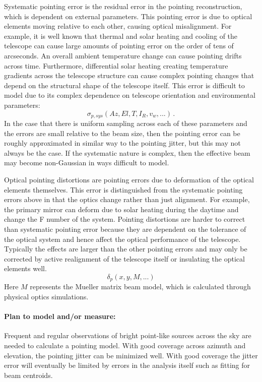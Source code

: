 Systematic pointing error is the residual error in the pointing reconstruction, which is dependent on external parameters. This pointing error is due to optical elements moving relative to each other, causing optical misalignment. For example, it is well known that thermal and solar heating and cooling of the telescope can cause large amounts of pointing error on the order of tens of arcseconds. An overall ambient temperature change can cause pointing drifts across time. Furthermore, differential solar heating creating temperature gradients across the telescope structure can cause complex pointing changes that depend on the structural shape of the telescope itself. This error is difficult to model due to its complex dependence on telescope orientation and environmental parameters:
\begin{equation}
\sigma_{p,sys} \left ( Az, El, T, I_{R}, v_{w}, ... \right ) \, .
\end{equation}
In the case that there is uniform sampling across each of these parameters and the errors are small relative to the beam size, then the pointing error can be roughly approximated in similar way to the pointing jitter, but this may not always be the case. If the systematic nature is complex, then the effective beam may become non-Gaussian in ways difficult to model.

Optical pointing distortions are pointing errors due to deformation of the optical elements themselves. This error is distinguished from the systematic pointing errors above in that the optics change rather than just alignment. For example, the primary mirror can deform due to solar heating during the daytime and change the F number of the system. Pointing distortions are harder to correct than systematic pointing error because they are dependent on the tolerance of the optical system and hence affect the optical performance of the telescope. Typically the effects are larger than the other pointing errors and may only be corrected by active realignment of the telescope itself or insulating the optical elements well.
\begin{equation}
\delta_{p} \left ( x, y, M, ... \right )
\end{equation}
Here $M$ represents the Mueller matrix beam model, which is calculated through physical optics simulations. 

\paragraph{Plan to model and/or measure:}
Frequent and regular observations of bright point-like sources across the sky are needed to calculate a pointing model. With good coverage across azimuth and elevation, the pointing jitter can be minimized well. With good coverage the jitter error will eventually be limited by errors in the analysis itself such as fitting for beam centroids.

